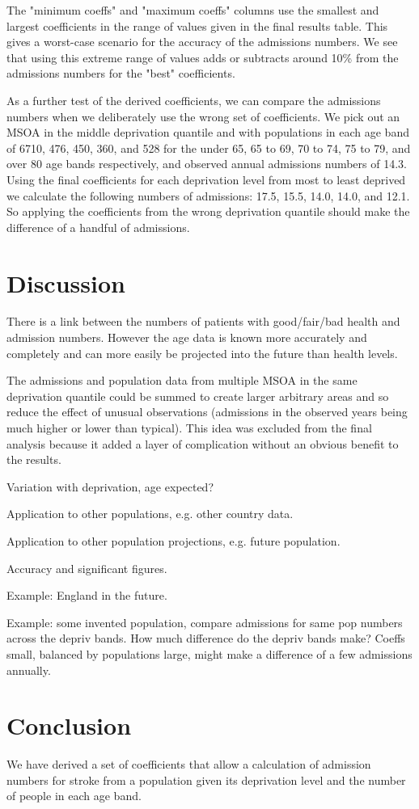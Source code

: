 \documentclass[12pt]{extarticle}
\begin{document}
The "minimum coeffs" and "maximum coeffs" columns use the smallest and largest coefficients in the range of values given in the final results table.
This gives a worst-case scenario for the accuracy of the admissions numbers.
We see that using this extreme range of values adds or subtracts around 10\% from the admissions numbers for the "best" coefficients.


As a further test of the derived coefficients, we can compare the admissions numbers when we deliberately use the wrong set of coefficients.
We pick out an MSOA in the middle deprivation quantile and with populations in each age band of 6710, 476, 450, 360, and 528 for the under 65, 65 to 69, 70 to 74, 75 to 79, and over 80 age bands respectively, and observed annual admissions numbers of 14.3.
% 
Using the final coefficients for each deprivation level from most to least deprived we calculate the following numbers of admissions: 17.5, 15.5, 14.0, 14.0, and 12.1.
%
So applying the coefficients from the wrong deprivation quantile should make the difference of a handful of admissions.

\section{Discussion}

There is a link between the numbers of patients with good/fair/bad health and admission numbers. However the age data is known more accurately and completely and can more easily be projected into the future than health levels.

The admissions and population data from multiple MSOA in the same deprivation quantile could be summed to create larger arbitrary areas and so reduce the effect of unusual observations (admissions in the observed years being much higher or lower than typical). This idea was excluded from the final analysis because it added a layer of complication without an obvious benefit to the results.


Variation with deprivation, age expected?

Application to other populations, e.g. other country data.

Application to other population projections, e.g. future population.

Accuracy and significant figures.


Example: England in the future.

Example: some invented population, compare admissions for same pop numbers across the depriv bands. How much difference do the depriv bands make? Coeffs small, balanced by populations large, might make a difference of a few admissions annually.


\section{Conclusion}

We have derived a set of coefficients that allow a calculation of admission numbers for stroke from a population given its deprivation level and the number of people in each age band.
\end{document}
